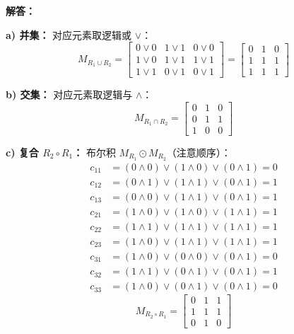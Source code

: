 \documentclass[11pt,UTF8]{article}
\begin{document}
\textbf{解答：}

\textbf{a) 并集：} 对应元素取逻辑或 $\lor$：
\[ M_{R_1 \cup R_2} = \begin{bmatrix} 0\lor0 & 1\lor1 & 0\lor0 \\ 1\lor0 & 1\lor1 & 1\lor1 \\ 1\lor1 & 0\lor1 & 0\lor1 \end{bmatrix} = \begin{bmatrix} 0 & 1 & 0 \\ 1 & 1 & 1 \\ 1 & 1 & 1 \end{bmatrix} \]

\textbf{b) 交集：} 对应元素取逻辑与 $\land$：
\[ M_{R_1 \cap R_2} = \begin{bmatrix} 0 & 1 & 0 \\ 0 & 1 & 1 \\ 1 & 0 & 0 \end{bmatrix} \]

\textbf{c) 复合 $R_2 \circ R_1$：} 布尔积 $M_{R_1} \odot M_{R_2}$（注意顺序）：
\begin{align*}
c_{11} &= (0\land0)\lor(1\land0)\lor(0\land1) = 0 \\
c_{12} &= (0\land1)\lor(1\land1)\lor(0\land1) = 1 \\
c_{13} &= (0\land0)\lor(1\land1)\lor(0\land1) = 1 \\
c_{21} &= (1\land0)\lor(1\land0)\lor(1\land1) = 1 \\
c_{22} &= (1\land1)\lor(1\land1)\lor(1\land1) = 1 \\
c_{23} &= (1\land0)\lor(1\land1)\lor(1\land1) = 1 \\
c_{31} &= (1\land0)\lor(0\land0)\lor(0\land1) = 0 \\
c_{32} &= (1\land1)\lor(0\land1)\lor(0\land1) = 1 \\
c_{33} &= (1\land0)\lor(0\land1)\lor(0\land1) = 0
\end{align*}
\[ M_{R_2 \circ R_1} = \begin{bmatrix} 0 & 1 & 1 \\ 1 & 1 & 1 \\ 0 & 1 & 0 \end{bmatrix} \]
\end{document}
